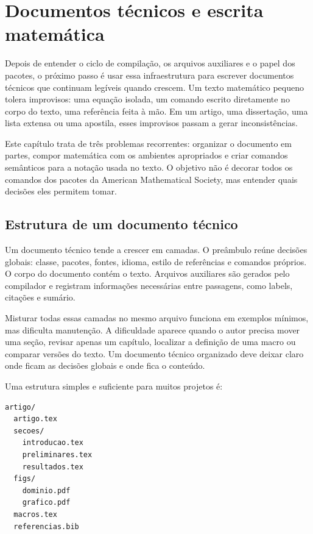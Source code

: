 \chapter{Documentos técnicos e escrita matemática}

Depois de entender o ciclo de compilação, os arquivos auxiliares e o papel dos pacotes, o próximo passo é usar essa infraestrutura para escrever documentos técnicos que continuam legíveis quando crescem. Um texto matemático pequeno tolera improvisos: uma equação isolada, um comando escrito diretamente no corpo do texto, uma referência feita à mão. Em um artigo, uma dissertação, uma lista extensa ou uma apostila, esses improvisos passam a gerar inconsistências.

Este capítulo trata de três problemas recorrentes: organizar o documento em partes, compor matemática com os ambientes apropriados e criar comandos semânticos para a notação usada no texto. O objetivo não é decorar todos os comandos dos pacotes da American Mathematical Society, mas entender quais decisões eles permitem tomar.

\section{Estrutura de um documento técnico}

Um documento técnico tende a crescer em camadas. O preâmbulo reúne decisões globais: classe, pacotes, fontes, idioma, estilo de referências e comandos próprios. O corpo do documento contém o texto. Arquivos auxiliares são gerados pelo compilador e registram informações necessárias entre passagens, como labels, citações e sumário.

Misturar todas essas camadas no mesmo arquivo funciona em exemplos mínimos, mas dificulta manutenção. A dificuldade aparece quando o autor precisa mover uma seção, revisar apenas um capítulo, localizar a definição de uma macro ou comparar versões do texto. Um documento técnico organizado deve deixar claro onde ficam as decisões globais e onde fica o conteúdo.

Uma estrutura simples e suficiente para muitos projetos é:

\begin{lstlisting}[caption={Estrutura possível de projeto}]
artigo/
  artigo.tex
  secoes/
    introducao.tex
    preliminares.tex
    resultados.tex
  figs/
    dominio.pdf
    grafico.pdf
  macros.tex
  referencias.bib
\end{lstlisting}

